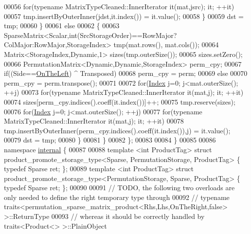 \begin{DoxyCode}
00056           \textcolor{keywordflow}{for}(\textcolor{keyword}{typename} MatrixTypeCleaned::InnerIterator it(mat,jsrc); it; ++it)
00057             tmp.insertByOuterInner(jdst,it.index()) = it.value();
00058         \}
00059         dst = tmp;
00060       \}
00061       \textcolor{keywordflow}{else}
00062       \{
00063         SparseMatrix<Scalar,int(SrcStorageOrder)==RowMajor?ColMajor:RowMajor,StorageIndex> tmp(mat.rows(), 
      mat.cols());
00064         Matrix<StorageIndex,Dynamic,1> sizes(tmp.outerSize());
00065         sizes.setZero();
00066         PermutationMatrix<Dynamic,Dynamic,StorageIndex> perm\_cpy;
00067         \textcolor{keywordflow}{if}((Side==\hyperlink{group__enums_ggac22de43beeac7a78b384f99bed5cee0ba129609b3bdf23b071f5f86cf2f995ec4}{OnTheLeft}) ^ Transposed)
00068           perm\_cpy = perm;
00069         \textcolor{keywordflow}{else}
00070           perm\_cpy = perm.transpose();
00071 
00072         \textcolor{keywordflow}{for}(\hyperlink{namespace_eigen_a62e77e0933482dafde8fe197d9a2cfde}{Index} j=0; j<mat.outerSize(); ++j)
00073           \textcolor{keywordflow}{for}(\textcolor{keyword}{typename} MatrixTypeCleaned::InnerIterator it(mat,j); it; ++it)
00074             sizes[perm\_cpy.indices().coeff(it.index())]++;
00075         tmp.reserve(sizes);
00076         \textcolor{keywordflow}{for}(\hyperlink{namespace_eigen_a62e77e0933482dafde8fe197d9a2cfde}{Index} j=0; j<mat.outerSize(); ++j)
00077           \textcolor{keywordflow}{for}(\textcolor{keyword}{typename} MatrixTypeCleaned::InnerIterator it(mat,j); it; ++it)
00078             tmp.insertByOuterInner(perm\_cpy.indices().coeff(it.index()),j) = it.value();
00079         dst = tmp;
00080       \}
00081     \}
00082 \};
00083 
00084 \}
00085 
00086 \textcolor{keyword}{namespace }\hyperlink{namespaceinternal}{internal} \{
00087 
00088 \textcolor{keyword}{template} <\textcolor{keywordtype}{int} ProductTag> \textcolor{keyword}{struct }product\_promote\_storage\_type<Sparse,             PermutationStorage, 
      ProductTag> \{ \textcolor{keyword}{typedef} Sparse ret; \};
00089 \textcolor{keyword}{template} <\textcolor{keywordtype}{int} ProductTag> \textcolor{keyword}{struct }product\_promote\_storage\_type<PermutationStorage, Sparse,             
      ProductTag> \{ \textcolor{keyword}{typedef} Sparse ret; \};
00090 
00091 \textcolor{comment}{// TODO, the following two overloads are only needed to define the right temporary type through }
00092 \textcolor{comment}{// typename traits<permutation\_sparse\_matrix\_product<Rhs,Lhs,OnTheRight,false> >::ReturnType}
00093 \textcolor{comment}{// whereas it should be correctly handled by traits<Product<> >::PlainObject}

\end{DoxyCode}
